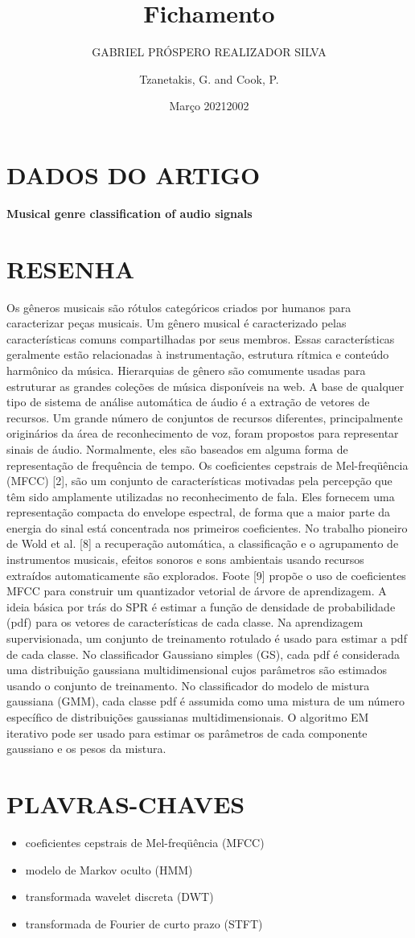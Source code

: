 \documentclass{article}
\title{Fichamento}
\author{GABRIEL PRÓSPERO REALIZADOR  SILVA}
\date{Março 2021}
\begin{document}
\maketitle

\section{DADOS DO ARTIGO}
\textbf{Musical genre classification of audio signals \\}
\author{Tzanetakis, G. and Cook, P. \\}
\date{2002}

\section{RESENHA}
Os gêneros musicais são rótulos categóricos criados por humanos para caracterizar peças musicais. Um gênero musical é caracterizado pelas características comuns compartilhadas por seus membros. Essas características geralmente estão relacionadas à instrumentação, estrutura rítmica e conteúdo harmônico da música. Hierarquias de gênero são comumente usadas para estruturar as grandes coleções de música disponíveis na web.
A base de qualquer tipo de sistema de análise automática de áudio é a extração de vetores de recursos. Um grande número de conjuntos de recursos diferentes, principalmente originários da área de reconhecimento de voz, foram propostos para representar sinais de áudio. Normalmente, eles são baseados em alguma forma de representação de frequência de tempo.
Os coeficientes cepstrais de Mel-freqüência (MFCC) [2], são um conjunto de características motivadas pela percepção que têm sido amplamente utilizadas no reconhecimento de fala. Eles fornecem uma representação compacta do envelope espectral, de forma que a maior parte da energia do sinal está concentrada nos primeiros coeficientes.
No trabalho pioneiro de Wold et al. [8] a recuperação automática, a classificação e o agrupamento de instrumentos musicais, efeitos sonoros e sons ambientais usando recursos extraídos automaticamente são explorados.
Foote [9] propõe o uso de coeficientes MFCC para construir um quantizador vetorial de árvore de aprendizagem.
A ideia básica por trás do SPR é estimar a função de densidade de probabilidade (pdf) para os vetores de características de cada classe. Na aprendizagem supervisionada, um conjunto de treinamento rotulado é usado para estimar a pdf de cada classe. No classificador Gaussiano simples (GS), cada pdf é considerada uma distribuição gaussiana multidimensional cujos parâmetros são estimados usando o conjunto de treinamento. No classificador do modelo de mistura gaussiana (GMM), cada classe pdf é assumida como uma mistura de um número específico de distribuições gaussianas multidimensionais. O algoritmo EM iterativo pode ser usado para estimar os parâmetros de cada componente gaussiano e os pesos da mistura.


\section{PLAVRAS-CHAVES}
\begin{itemize}
    \item coeficientes cepstrais de Mel-freqüência (MFCC)
    \item modelo de Markov oculto (HMM)
    \item transformada wavelet discreta (DWT)
    \item transformada de Fourier de curto prazo (STFT)
\end{itemize}
\end{document}
